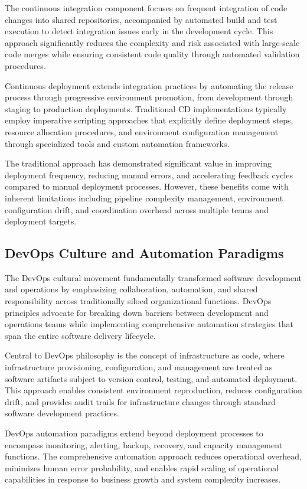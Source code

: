 The continuous integration component focuses on frequent integration of code changes into shared repositories, accompanied by automated build and test execution to detect integration issues early in the development cycle. This approach significantly reduces the complexity and risk associated with large-scale code merges while ensuring consistent code quality through automated validation procedures.

Continuous deployment extends integration practices by automating the release process through progressive environment promotion, from development through staging to production deployments. Traditional CD implementations typically employ imperative scripting approaches that explicitly define deployment steps, resource allocation procedures, and environment configuration management through specialized tools and custom automation frameworks.

The traditional approach has demonstrated significant value in improving deployment frequency, reducing manual errors, and accelerating feedback cycles compared to manual deployment processes. However, these benefits come with inherent limitations including pipeline complexity management, environment configuration drift, and coordination overhead across multiple teams and deployment targets.

\subsection{DevOps Culture and Automation Paradigms}

The DevOps cultural movement fundamentally transformed software development and operations by emphasizing collaboration, automation, and shared responsibility across traditionally siloed organizational functions. DevOps principles advocate for breaking down barriers between development and operations teams while implementing comprehensive automation strategies that span the entire software delivery lifecycle.

Central to DevOps philosophy is the concept of infrastructure as code, where infrastructure provisioning, configuration, and management are treated as software artifacts subject to version control, testing, and automated deployment. This approach enables consistent environment reproduction, reduces configuration drift, and provides audit trails for infrastructure changes through standard software development practices.

DevOps automation paradigms extend beyond deployment processes to encompass monitoring, alerting, backup, recovery, and capacity management functions. The comprehensive automation approach reduces operational overhead, minimizes human error probability, and enables rapid scaling of operational capabilities in response to business growth and system complexity increases.

